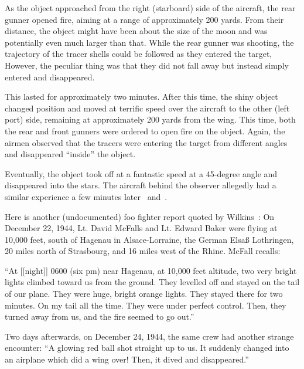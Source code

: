 As the object approached from the right (starboard) side of the aircraft, the rear gunner opened fire,
aiming at a range of approximately 200 yards.
From their distance, the object might have been about the size of the moon and was potentially even much larger than that.
While the rear gunner was shooting, the trajectory of the tracer shells could be followed as they entered the target,
However, the peculiar thing was that they did not fall away but instead simply entered and disappeared.

This lasted for approximately two minutes. After this time, the shiny object changed position and moved at terrific speed over the aircraft to the
other (left port) side,
remaining at approximately 200 yards from the wing.
This time, both the rear and front gunners were ordered to open fire on the object.
Again, the airmen observed that the tracers were entering the target from different angles and disappeared ``inside'' the object.

Eventually, the object took off at a fantastic
speed at a 45-degree angle and disappeared into the stars.
The aircraft behind the observer allegedly had a similar experience a few minutes later~\cite[Chapter~3,note~64]{Chester2007May} and~\cite{MUFONUFOJ-290}.


Here is another (undocumented) foo fighter report quoted by Wilkins~\cite[Chapter~II]{Wilkins1954Jan}:
On December 22, 1944, Lt. David McFalls and Lt. Edward Baker were flying at 10,000 feet,
south of Hagenau in Alsace-Lorraine, the German Elsa{\ss} Lothringen, 20 miles north of Strasbourg, and 16 miles west of the Rhine.
McFall recalls:
\begin{svgraybox}
``At [[night]] 0600 (six pm) near Hagenau, at 10,000 feet altitude, two very bright lights climbed toward
us from the ground. They levelled off and stayed on the tail of our plane. They were huge,
bright orange lights. They stayed there for two minutes. On my tail all the time. They were
under perfect control. Then, they turned away from us, and the fire seemed to go out.''
\end{svgraybox}
Two days afterwards, on December 24, 1944, the same crew had another strange encounter:
``A glowing red ball shot straight up to us. It suddenly changed into an airplane which did a wing over! Then, it dived and disappeared.''


